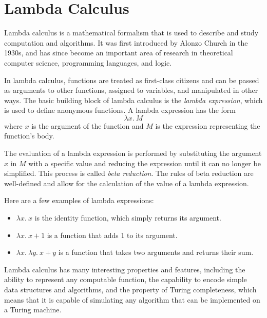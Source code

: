 \documentclass{article}
\begin{document}
\pagebreak 

\section{Lambda Calculus}

Lambda calculus is a mathematical formalism that is used to describe and study computation and algorithms. It was first introduced by Alonzo Church in the 1930s, and has since become an important area of research in theoretical computer science, programming languages, and logic.

\vspace{3mm}
In lambda calculus, functions are treated as first-class citizens and can be passed as arguments to other functions, assigned to variables, and manipulated in other ways. The basic building block of lambda calculus is the \textit{lambda expression}, which is used to define anonymous functions. A lambda expression has the form $$\lambda x.\ M$$ where $x$ is the argument of the function and $M$ is the expression representing the function's body.

\vspace{3mm}
The evaluation of a lambda expression is performed by substituting the argument $x$ in $M$ with a specific value and reducing the expression until it can no longer be simplified. This process is called \textit{beta reduction}. The rules of beta reduction are well-defined and allow for the calculation of the value of a lambda expression.

\vspace{3mm}
Here are a few examples of lambda expressions:

\begin{itemize}
\item $\lambda x.\ x$ is the identity function, which simply returns its argument.
\item $\lambda x.\ x + 1$ is a function that adds 1 to its argument.
\item $\lambda x.\ \lambda y.\ x + y$ is a function that takes two arguments and returns their sum.
\end{itemize}

\vspace{3mm}
Lambda calculus has many interesting properties and features, including the ability to represent any computable function, the capability to encode simple data structures and algorithms, and the property of Turing completeness, which means that it is capable of simulating any algorithm that can be implemented on a Turing machine.
\end{document}
